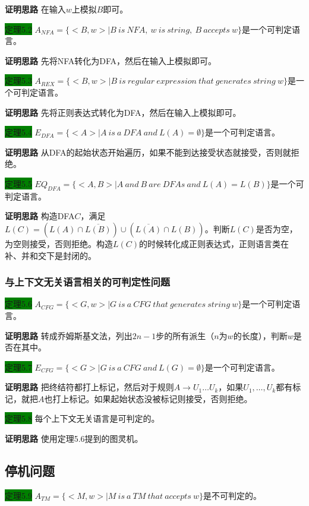 \documentclass[a4paper]{article}
\begin{document}
	\textbf{证明思路} \quad 在输入$w$上模拟$B$即可。
	
	\colorbox{green}{定理5.2} $A_{NFA}=\{<B,w>|B~is~NFA,~w~is~string,~B~accepts~w\}$是一个可判定语言。
	
	\textbf{证明思路} \quad 先将NFA转化为DFA，然后在输入上模拟即可。
	
	\colorbox{green}{定理5.3} $A_{REX}=\{<B,w>|B~is~regular~expression~that~generates~string~w\}$是一个可判定语言。
	
	\textbf{证明思路} \quad 先将正则表达式转化为DFA，然后在输入上模拟即可。
	
	\colorbox{green}{定理5.4} $E_{DFA}=\{<A>|A~is~a~DFA~and~L(A)=\emptyset\}$是一个可判定语言。
	
	\textbf{证明思路} \quad 从DFA的起始状态开始遍历，如果不能到达接受状态就接受，否则就拒绝。

	\colorbox{green}{定理5.5} $EQ_{DFA}=\{<A,B>|A~and~B~are~DFAs~and~L(A)=L(B)\}$是一个可判定语言。
	
	\textbf{证明思路} \quad 构造DFA$C$，满足$L(C)=(L(A) \cap \overline{L(B)}) \cup (\overline{L(A)} \cap L(B))$。判断$L(C)$是否为空，为空则接受，否则拒绝。构造$L(C)$的时候转化成正则表达式，正则语言类在补、并和交下是封闭的。

\subsubsection{与上下文无关语言相关的可判定性问题}

	\colorbox{green}{定理5.6} $A_{CFG}=\{<G,w>|G~is~a~CFG~that~generates~string~w\}$是一个可判定语言。
	
	\textbf{证明思路} \quad 转成乔姆斯基文法，列出$2n-1$步的所有派生（$n$为$w$的长度），判断$w$是否在其中。
	
	\colorbox{green}{定理5.7} $E_{CFG}=\{<G>|G~is~a~CFG~and~L(G)=\emptyset\}$是一个可判定语言。
	
	\textbf{证明思路} \quad 把终结符都打上标记，然后对于规则$A \rightarrow U_1 \dots U_k$，如果$U_1,\dots,U_k$都有标记，就把$A$也打上标记。如果起始状态没被标记则接受，否则拒绝。
	
	\colorbox{green}{定理5.8} 每个上下文无关语言是可判定的。
	
	\textbf{证明思路} \quad 使用定理5.6提到的图灵机。

\subsection{停机问题}

	\colorbox{green}{定理5.9} $A_{TM}=\{<M,w>|M~is~a~TM~that~accepts~w\}$是不可判定的。
	
\end{document}
